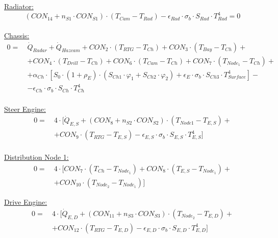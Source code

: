 \underline{Radiator:}
\begin{equation}(CON_{14} +n_{S1}\cdot CON_{S1}) \cdot (T_{Cam}-T_{Rad}) - \epsilon_{Rad}\cdot \sigma_b \cdot S_{Rad}\cdot T_{Rad}^4= 0  \end{equation}  \\

\underline{Chassis:}
\begin{equation}
\begin{aligned}
0=\  &   \dot{Q}_{Radar}+\dot{Q}_{Hazcam}  +CON_2 \cdot (T_{RTG}-T_{Ch})+CON_3 \cdot (T_{Bay}-T_{Ch})+ \\[1em]
&  +CON_4 \cdot (T_{Drill}-T_{Ch})+ CON_6 \cdot (T_{Cam}-T_{Ch})+CON_7 \cdot (T_{Node_1}-T_{Ch}) +  \\[1em]
&  + \alpha_{Ch}\cdot [ S_0 \cdot (1+\rho_E) \cdot (S_{Ch1} \cdot \varphi_1  +S_{Ch2} \cdot \varphi_2 ) +   \epsilon_{E} \cdot \sigma_b \cdot S_{Ch3}\cdot T_{Surface}^4 ]-  \\[1em]
&   -\epsilon_{Ch}\cdot \sigma_b \cdot S_{Ch}\cdot T_{Ch}^4 \\[2em]
\end{aligned}
\end{equation}

\underline{Steer Engine:}
\begin{equation}
\begin{aligned}
0=\  &  4\cdot [\dot{Q}_{E,S} +(CON_8 +n_{S2}\cdot CON_{S2}) \cdot (T_{Node1}-T_{E,S})+ \\[1em]
&   +CON_9 \cdot (T_{RTG}-T_{E,S}) -\epsilon_{E,S}\cdot \sigma_b \cdot S_{E,S}\cdot T_{E,S}^4] \\[2em]
\end{aligned}
\end{equation}

\underline{Distribution Node 1:}
\begin{equation}
\begin{aligned}
0=\  &  4\cdot [CON_7 \cdot (T_{Ch}-T_{Node_1})+CON_8 \cdot (T_{E,S}-T_{Node_1})+ \\[1em]
&   +CON_10 \cdot (T_{Node_2}-T_{Node_1})] %
\end{aligned}
\end{equation}

\underline{Drive Engine:}
\begin{equation}
\begin{aligned}
0=\  &  4 \cdot [\dot{Q}_{E,D}+ (CON_{11}+n_{S3}\cdot CON_{S3}) \cdot (T_{Node_2}-T_{E,D})+ \\[1em]
&  + CON_{12} \cdot (T_{RTG}-T_{E,D})-\epsilon_{E,D}\cdot \sigma_b \cdot S_{E,D}\cdot T_{E,D}^4 ]  %
\end{aligned}
\end{equation}


